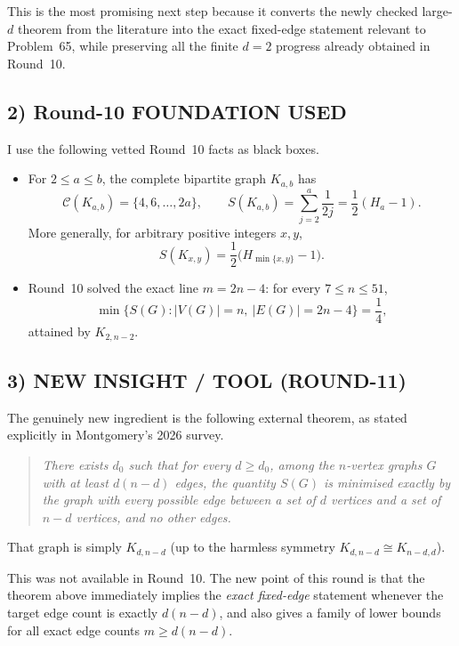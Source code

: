 This is the most promising next step because it converts the newly checked large-$d$ theorem from the literature into the exact fixed-edge statement relevant to Problem~65, while preserving all the finite $d=2$ progress already obtained in Round~10.

\subsection*{2) Round-10 FOUNDATION USED}

I use the following vetted Round~10 facts as black boxes.

\begin{itemize}
\item[(F1)] For $2\le a\le b$, the complete bipartite graph $K_{a,b}$ has
\[
\mathcal C(K_{a,b})=\{4,6,\dots,2a\},
\qquad
S(K_{a,b})=\sum_{j=2}^{a}\frac1{2j}=\frac12(H_a-1).
\]
More generally, for arbitrary positive integers $x,y$,
\[
S(K_{x,y})=\frac12\bigl(H_{\min\{x,y\}}-1\bigr).
\]

\item[(F2)] Round~10 solved the exact line $m=2n-4$: for every $7\le n\le 51$,
\[
\min\{S(G): |V(G)|=n,\ |E(G)|=2n-4\}=\frac14,
\]
attained by $K_{2,n-2}$.
\end{itemize}

\subsection*{3) NEW INSIGHT / TOOL (ROUND-11)}

The genuinely new ingredient is the following external theorem, as stated explicitly in Montgomery's 2026 survey.

\begin{quote}
\emph{There exists $d_0$ such that for every $d\ge d_0$, among the $n$-vertex graphs $G$ with at least $d(n-d)$ edges, the quantity $S(G)$ is minimised exactly by the graph with every possible edge between a set of $d$ vertices and a set of $n-d$ vertices, and no other edges.}
\end{quote}

That graph is simply $K_{d,n-d}$ (up to the harmless symmetry $K_{d,n-d}\cong K_{n-d,d}$).

This was not available in Round~10. The new point of this round is that the theorem above immediately implies the \emph{exact fixed-edge} statement whenever the target edge count is exactly $d(n-d)$, and also gives a family of lower bounds for all exact edge counts $m\ge d(n-d)$.

